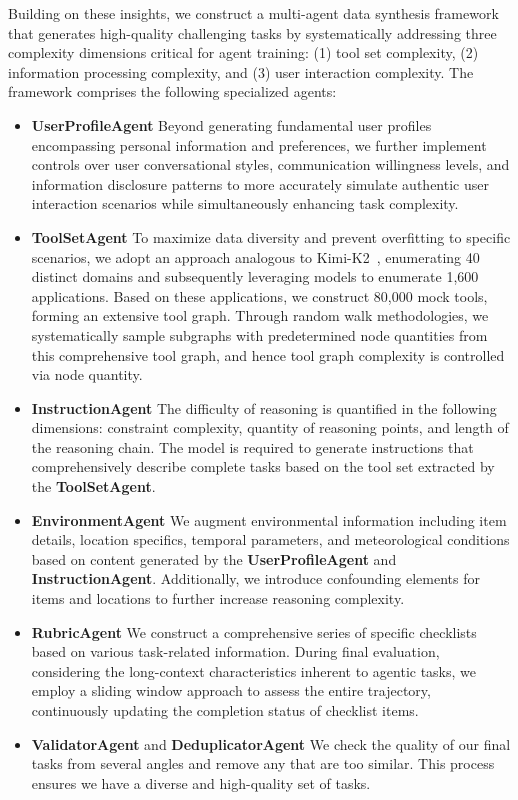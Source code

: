 \documentclass{article}
\begin{document}
Building on these insights, we construct a multi-agent data synthesis framework that generates high-quality challenging tasks by systematically addressing three complexity dimensions critical for agent training: (1) tool set complexity, (2) information processing complexity, and (3) user interaction complexity. The framework comprises the following specialized agents:

\begin{itemize}
\item \textbf{UserProfileAgent} Beyond generating fundamental user profiles encompassing personal information and preferences, we further implement controls over user conversational styles, communication willingness levels, and information disclosure patterns to more accurately simulate authentic user interaction scenarios while simultaneously enhancing task complexity.

\item \textbf{ToolSetAgent} To maximize data diversity and prevent overfitting to specific scenarios, we adopt an approach analogous to Kimi-K2~\citep{team2025kimi}, enumerating 40 distinct domains and subsequently leveraging models to enumerate 1,600 applications. Based on these applications, we construct 80,000 mock tools, forming an extensive tool graph. Through random walk methodologies, we systematically sample subgraphs with predetermined node quantities from this comprehensive tool graph, and hence tool graph complexity is controlled via node quantity.

\item \textbf{InstructionAgent} The difficulty of reasoning is quantified in the following dimensions: constraint complexity, quantity of reasoning points, and length of the reasoning chain. The model is required to generate instructions that comprehensively describe complete tasks based on the tool set extracted by the \textbf{ToolSetAgent}.

\item \textbf{EnvironmentAgent} We augment environmental information including item details, location specifics, temporal parameters, and meteorological conditions based on content generated by the \textbf{UserProfileAgent} and \textbf{InstructionAgent}. Additionally, we introduce confounding elements for items and locations to further increase reasoning complexity.

\item \textbf{RubricAgent} We construct a comprehensive series of specific checklists based on various task-related information. During final evaluation, considering the long-context characteristics inherent to agentic tasks, we employ a sliding window approach to assess the entire trajectory, continuously updating the completion status of checklist items.

\item \textbf{ValidatorAgent} and \textbf{DeduplicatorAgent} We check the quality of our final tasks from several angles and remove any that are too similar. This process ensures we have a diverse and high-quality set of tasks.
\end{itemize}
\end{document}

